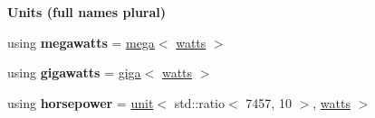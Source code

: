 \begin{Indent}{\bf Units (full names plural)}
\begin{DoxyCompactItemize}
\item 
\hypertarget{namespaceunits_1_1power_a041520be35cc1c2166dbff36824bb89d}{}using {\bfseries megawatts} = \hyperlink{group___unit_manipulators_gab1e685fcf4dd9478ed3d688f7af50842}{mega}$<$ \hyperlink{structunits_1_1unit}{watts} $>$\label{namespaceunits_1_1power_a041520be35cc1c2166dbff36824bb89d}

\item 
\hypertarget{namespaceunits_1_1power_a771641680e2703730bcac72c10c501bf}{}using {\bfseries gigawatts} = \hyperlink{group___unit_manipulators_ga4595911f659ef61133216da15d61eb07}{giga}$<$ \hyperlink{structunits_1_1unit}{watts} $>$\label{namespaceunits_1_1power_a771641680e2703730bcac72c10c501bf}

\item 
\hypertarget{namespaceunits_1_1power_ada565301f787d8e19815992761798600}{}using {\bfseries horsepower} = \hyperlink{structunits_1_1unit}{unit}$<$ std\+::ratio$<$ 7457, 10 $>$, \hyperlink{structunits_1_1unit}{watts} $>$\label{namespaceunits_1_1power_ada565301f787d8e19815992761798600}

\end{DoxyCompactItemize}
\end{Indent}
